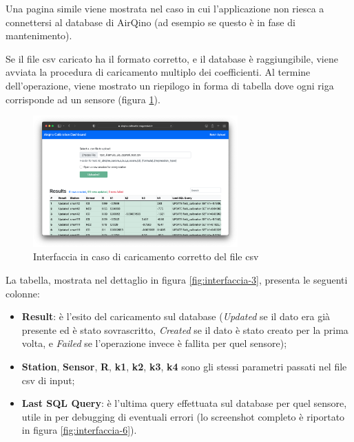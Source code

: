 Una pagina simile viene mostrata nel caso in cui l'applicazione non riesca a connettersi al database di AirQino (ad esempio se questo è in fase di mantenimento).

Se il file csv caricato ha il formato corretto, e il database è raggiungibile, viene avviata la procedura di caricamento multiplo dei coefficienti. Al termine dell'operazione, viene mostrato un riepilogo in forma di tabella dove ogni riga corrisponde ad un sensore (figura \ref{fig:interfaccia-2}).

\begin{figure}[H]
\centering
\includegraphics[width=0.70\textwidth,height=\textheight,keepaspectratio]{img/interfaccia_2}
\caption{Interfaccia in caso di caricamento corretto del file csv}
\label{fig:interfaccia-2}
\end{figure}

La tabella, mostrata nel dettaglio in figura \ref{fig:interfaccia-3}, presenta le seguenti colonne:
\begin{itemize}
  \item \textbf{Result}: è l'esito del caricamento sul database (\textit{Updated} se il dato era già presente ed è stato sovrascritto, \textit{Created} se il dato è stato creato per la prima volta, e \textit{Failed} se l'operazione invece è fallita per quel sensore);
  \item \textbf{Station}, \textbf{Sensor}, \textbf{R}, \textbf{k1}, \textbf{k2}, \textbf{k3}, \textbf{k4} sono gli stessi parametri passati nel file csv di input;
  \item \textbf{Last SQL Query}: è l'ultima query effettuata sul database per quel sensore, utile in per debugging di eventuali errori (lo screenshot completo è riportato in figura \ref{fig:interfaccia-6}).
\end{itemize}

